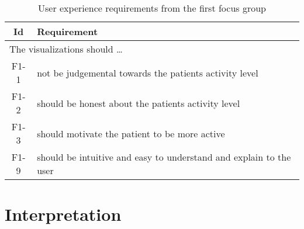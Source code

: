 \begin{table}[h!]
  \begin{center}
  \begin{tabular}{|c|p{12cm}|}
    \hline
      \textbf{Id} & \textbf{Requirement} \\ \hline
    \multicolumn{2}{|l|}{The visualizations should \ldots} \\ \hline
      F1-1 & not be judgemental towards the patients activity level \\ \hline
      F1-2 & should be honest about the patients activity level \\ \hline
      F1-3 & should motivate the patient to be more active \\ \hline
      F1-9 & should be intuitive and easy to understand and explain to the user \\ \hline
  \end{tabular}
  \end{center}
  \caption{User experience requirements from the first focus group}
\end{table}

\section{Interpretation}

